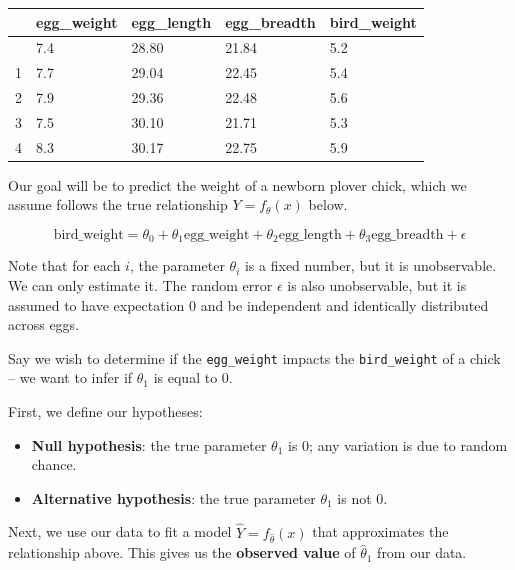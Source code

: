 \documentclass[
  letterpaper,
  DIV=11,
  numbers=noendperiod]{scrreprt}
\providecommand{\tightlist}{%
  \setlength{\itemsep}{0pt}\setlength{\parskip}{0pt}}\usepackage{longtable,booktabs,array}
\begin{document}
\begin{longtable}[]{@{}lllll@{}}
\toprule\noalign{}
& egg\_weight & egg\_length & egg\_breadth & bird\_weight \\
\midrule\noalign{}
\endhead
\bottomrule\noalign{}
\endlastfoot
0 & 7.4 & 28.80 & 21.84 & 5.2 \\
1 & 7.7 & 29.04 & 22.45 & 5.4 \\
2 & 7.9 & 29.36 & 22.48 & 5.6 \\
3 & 7.5 & 30.10 & 21.71 & 5.3 \\
4 & 8.3 & 30.17 & 22.75 & 5.9 \\
\end{longtable}

Our goal will be to predict the weight of a newborn plover chick, which
we assume follows the true relationship \(Y = f_{\theta}(x)\) below.

\[\text{bird\_weight} = \theta_0 + \theta_1 \text{egg\_weight} + \theta_2 \text{egg\_length} + \theta_3 \text{egg\_breadth} + \epsilon\]

Note that for each \(i\), the parameter \(\theta_i\) is a fixed number,
but it is unobservable. We can only estimate it. The random error
\(\epsilon\) is also unobservable, but it is assumed to have expectation
0 and be independent and identically distributed across eggs.

Say we wish to determine if the \texttt{egg\_weight} impacts the
\texttt{bird\_weight} of a chick -- we want to infer if \(\theta_1\) is
equal to 0.

First, we define our hypotheses:

\begin{itemize}
\tightlist
\item
  \textbf{Null hypothesis}: the true parameter \(\theta_1\) is 0; any
  variation is due to random chance.
\item
  \textbf{Alternative hypothesis}: the true parameter \(\theta_1\) is
  not 0.
\end{itemize}

Next, we use our data to fit a model \(\hat{Y} = f_{\hat{\theta}}(x)\)
that approximates the relationship above. This gives us the
\textbf{observed value} of \(\hat{\theta}_1\) from our data.
\end{document}
